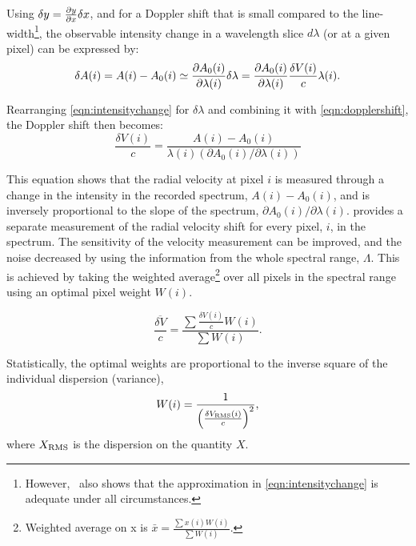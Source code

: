 
Using \(\delta y = \frac{\partial{y}}{\partial{x}} \delta x \nonumber\), and for a Doppler shift that is small compared to the line-width\footnote{However,~\citet{connes_absolute_1985} also shows that the approximation in \cref{eqn:intensitychange} is adequate under all circumstances.}, the observable intensity change in a wavelength slice \(d \lambda\) (or at a given pixel) can be expressed by:
\begin{equation}
\delta A(i) = A(i) - {A}_{0}(i) \simeq \frac{\partial{{A}_{0}(i)}}{\partial{\lambda(i)}} \delta \lambda = \frac{\partial{{A}_{0}(i)}}{\partial{\lambda(i)}} \frac{\delta V(i)}{c}\lambda(i).
\label{eqn:intensitychange}
\end{equation}

Rearranging \cref{eqn:intensitychange} for \(\delta \lambda\) and combining it with \cref{eqn:dopplershift}, the Doppler shift then becomes:
\begin{equation}
\frac{\delta V(i)}{c} = \frac{A(i) - {A}_{0}(i) }{\lambda(i) (\partial {A}_{0}(i)/\partial \lambda(i))} \label{eqn:delta_v_i}
\end{equation}

This equation shows that the radial velocity at pixel {\(i\)} is measured through a change in the intensity in the recorded spectrum, \(A(i)-{A}_{0}(i)\), and is inversely proportional to the slope of the spectrum, \({\partial {A}_{0}(i)}/{\partial \lambda(i)}\).
 provides a separate measurement of the radial velocity shift for every pixel, \(i\), in the spectrum.
The sensitivity of the velocity measurement can be improved, and the noise decreased by using the information from the whole spectral range, \(\Lambda\).
This is achieved by taking the weighted average\footnote{Weighted average on x is \(\bar{x} = \frac{\sum{ x(i)W(i)}}{\sum {W(i)}}\).} over all pixels in the spectral range using an optimal pixel weight \(W(i)\).

\begin{equation}
\overline{\frac{\delta V}{c}} = \frac{\sum{\frac{\delta V(i)}{c}W(i)}}{\sum {W(i)}}.
\end{equation}

Statistically, the optimal weights are proportional to the inverse square of the individual dispersion (variance),
\begin{equation}
W(i) = \frac{1}{{\left(\frac{\delta V_{\textrm{RMS}}(i)}{c}\right)}^{2}}, \label{eqn:weights}
\end{equation}
where \(X_{\textrm{RMS}}\) is the dispersion on the quantity \(X\).

